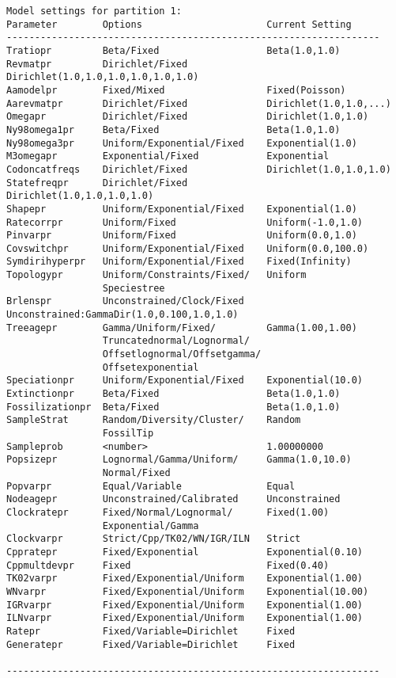 \documentclass[12pt]{book}
\begin{document}
\begin{Verbatim}[fontsize=\footnotesize]
Model settings for partition 1:
Parameter        Options                      Current Setting
------------------------------------------------------------------
Tratiopr         Beta/Fixed                   Beta(1.0,1.0)
Revmatpr         Dirichlet/Fixed              Dirichlet(1.0,1.0,1.0,1.0,1.0,1.0)
Aamodelpr        Fixed/Mixed                  Fixed(Poisson)
Aarevmatpr       Dirichlet/Fixed              Dirichlet(1.0,1.0,...)
Omegapr          Dirichlet/Fixed              Dirichlet(1.0,1.0)
Ny98omega1pr     Beta/Fixed                   Beta(1.0,1.0)
Ny98omega3pr     Uniform/Exponential/Fixed    Exponential(1.0)
M3omegapr        Exponential/Fixed            Exponential
Codoncatfreqs    Dirichlet/Fixed              Dirichlet(1.0,1.0,1.0)
Statefreqpr      Dirichlet/Fixed              Dirichlet(1.0,1.0,1.0,1.0)
Shapepr          Uniform/Exponential/Fixed    Exponential(1.0)
Ratecorrpr       Uniform/Fixed                Uniform(-1.0,1.0)
Pinvarpr         Uniform/Fixed                Uniform(0.0,1.0)
Covswitchpr      Uniform/Exponential/Fixed    Uniform(0.0,100.0)
Symdirihyperpr   Uniform/Exponential/Fixed    Fixed(Infinity)
Topologypr       Uniform/Constraints/Fixed/   Uniform
                 Speciestree
Brlenspr         Unconstrained/Clock/Fixed    Unconstrained:GammaDir(1.0,0.100,1.0,1.0)
Treeagepr        Gamma/Uniform/Fixed/         Gamma(1.00,1.00)
                 Truncatednormal/Lognormal/
                 Offsetlognormal/Offsetgamma/
                 Offsetexponential
Speciationpr     Uniform/Exponential/Fixed    Exponential(10.0)
Extinctionpr     Beta/Fixed                   Beta(1.0,1.0)
Fossilizationpr  Beta/Fixed                   Beta(1.0,1.0)
SampleStrat      Random/Diversity/Cluster/    Random
                 FossilTip
Sampleprob       <number>                     1.00000000
Popsizepr        Lognormal/Gamma/Uniform/     Gamma(1.0,10.0)
                 Normal/Fixed
Popvarpr         Equal/Variable               Equal
Nodeagepr        Unconstrained/Calibrated     Unconstrained
Clockratepr      Fixed/Normal/Lognormal/      Fixed(1.00)
                 Exponential/Gamma
Clockvarpr       Strict/Cpp/TK02/WN/IGR/ILN   Strict
Cppratepr        Fixed/Exponential            Exponential(0.10)
Cppmultdevpr     Fixed                        Fixed(0.40)
TK02varpr        Fixed/Exponential/Uniform    Exponential(1.00)
WNvarpr          Fixed/Exponential/Uniform    Exponential(10.00)
IGRvarpr         Fixed/Exponential/Uniform    Exponential(1.00)
ILNvarpr         Fixed/Exponential/Uniform    Exponential(1.00)
Ratepr           Fixed/Variable=Dirichlet     Fixed
Generatepr       Fixed/Variable=Dirichlet     Fixed

------------------------------------------------------------------
\end{Verbatim}
\end{document}
